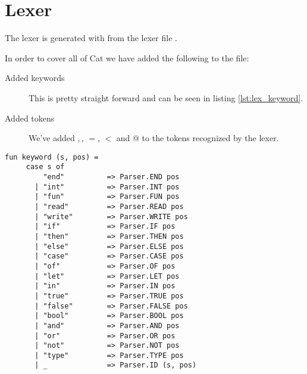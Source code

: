 \chapter{Lexer}
The lexer is generated with  from the lexer file
.

In order to cover all of Cat we have added the following to the file:

\begin{description}
\item [Added keywords] This is pretty straight forward and can be seen in
        listing \ref{lst:lex_keyword}.
\item [Added tokens] We've added $,$, $=$, $<$ and $@$ to the tokens recognized
        by the lexer. 
\end{description}

\begin{lstlisting}
fun keyword (s, pos) =                     
     case s of                             
         "end"          => Parser.END pos
       | "int"          => Parser.INT pos
       | "fun"          => Parser.FUN pos
       | "read"         => Parser.READ pos
       | "write"        => Parser.WRITE pos
       | "if"           => Parser.IF pos
       | "then"         => Parser.THEN pos
       | "else"         => Parser.ELSE pos
       | "case"         => Parser.CASE pos
       | "of"           => Parser.OF pos
       | "let"          => Parser.LET pos
       | "in"           => Parser.IN pos
       | "true"         => Parser.TRUE pos
       | "false"        => Parser.FALSE pos
       | "bool"         => Parser.BOOL pos
       | "and"          => Parser.AND pos
       | "or"           => Parser.OR pos
       | "not"          => Parser.NOT pos
       | "type"         => Parser.TYPE pos
       | _              => Parser.ID (s, pos) 
\end{lstlisting}\label{lst:lex_keyword}
